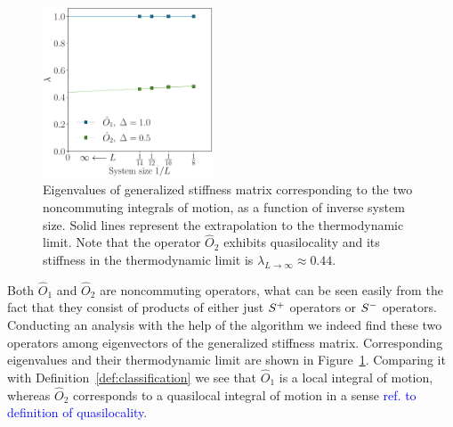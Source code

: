 \begin{figure}[htbp]
  \centering
  \includegraphics[width=0.45\textwidth]{Figures/nocomm_int.pdf}
  \caption{Eigenvalues of generalized stiffness matrix corresponding to the two noncommuting
    integrals of motion, as a function of inverse system size. Solid lines represent the extrapolation
    to the thermodynamic limit. Note that the operator \(\hat{O}_2\) exhibits quasilocality
    and its stiffness in the thermodynamic limit is \(\lambda_{L\to\infty} \approx
    0.44\).}
  \label{fig: noncommuting integrable}
\end{figure}

Both \(\hat{O}_1\) and \(\hat{O}_2\) are noncommuting operators, what can be seen easily from the
fact that they consist of products of either just \(S^{+}\) operators or \(S^{-}\) operators. Conducting
an analysis with the help of the algorithm we indeed find these two operators among eigenvectors
of the generalized stiffness matrix. Corresponding eigenvalues and their thermodynamic limit
are shown in Figure~\ref{fig: noncommuting integrable}. Comparing it with Definition~\ref{def:classification}
we see that \(\hat{O}_1\) is a local integral of motion, whereas \(\hat{O}_2\) corresponds to a quasilocal 
integral of motion in a sense \textcolor{blue}{ref. to definition of quasilocality}. 